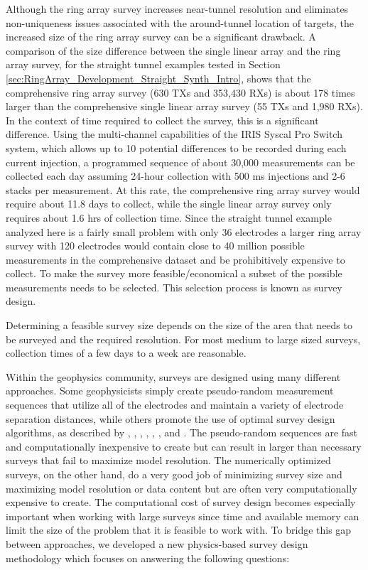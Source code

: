 \documentclass[preprint,authoryear,12pt]{elsarticle}
\begin{document}
Although the ring array survey increases near-tunnel resolution and eliminates non-uniqueness issues associated with the around-tunnel location of targets, the increased size of the ring array survey can be a significant drawback. A comparison of the size difference between the single linear array and the ring array survey, for the straight tunnel examples tested in Section \ref{sec:RingArray_Development_Straight_Synth_Intro}, shows that the comprehensive ring array survey (630 TXs and 353,430 RXs) is about 178 times larger than the comprehensive single linear array survey (55 TXs and 1,980 RXs). In the context of time required to collect the survey, this is a significant difference. Using the multi-channel capabilities of the IRIS Syscal Pro Switch system, which allows up to 10 potential differences to be recorded during each current injection, a programmed sequence of about 30,000 measurements can be collected each day assuming 24-hour collection with 500 ms injections and 2-6 stacks per measurement. At this rate, the comprehensive ring array survey would require about 11.8 days to collect, while the single linear array survey only requires about 1.6 hrs of collection time. Since the straight tunnel example analyzed here is a fairly small problem with only 36 electrodes a larger ring array survey with 120 electrodes would contain close to 40 million possible measurements in the comprehensive dataset and be prohibitively expensive to collect. To make the survey more feasible/economical a subset of the possible measurements needs to be selected. This selection process is known as survey design.

Determining a feasible survey size depends on the size of the area that needs to be surveyed and the required resolution. For most medium to large sized surveys, collection times of a few days to a week are reasonable.

Within the geophysics community, surveys are designed using many different approaches. Some geophysicists simply create pseudo-random measurement sequences that utilize all of the electrodes and maintain a variety of electrode separation distances, while others promote the use of optimal survey design algorithms, as described by \citet{Curtis1999}, \citet{Stummer2004}, \citet{Wilkinson2006a}, \citet{Maurer2010}, \citet{Haber2012a}, \citet{Wilkinson2012}, \citet{Loke2014} and \citet{Uhlemann2018}. The pseudo-random sequences are fast and computationally inexpensive to create but can result in larger than necessary surveys that fail to maximize model resolution. The numerically optimized surveys, on the other hand, do a very good job of minimizing survey size and maximizing model resolution or data content but are often very computationally expensive to create. The computational cost of survey design becomes especially important when working with large surveys since time and available memory can limit the size of the problem that it is feasible to work with. To bridge this gap between approaches, we developed a new physics-based survey design methodology which focuses on answering the following questions:
\end{document}
